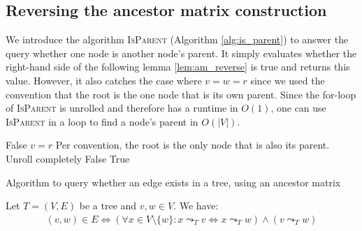 \subsection{Reversing the ancestor matrix construction}

We introduce the algorithm \textsc{IsParent} (Algorithm \ref{alg:is_parent}) to answer the query whether one node is another node's parent. It simply evaluates whether the right-hand side of the following lemma \ref{lem:am_reverse} is true and returns this value. However, it also catches the case where $v = w = r$ since we used the convention that the root is the one node that is its own parent. Since the for-loop of \textsc{IsParent} is unrolled and therefore has a runtime in $O(1)$, one can use \textsc{IsParent} in a loop to find a node's parent in $O(|V|)$.

\begin{algorithm}
    \begin{algorithmic}[1]
                \State \Return False
            \EndIf
                \State \Return $v = r$ \Comment Per convention, the root is the only node that is also its parent.
            \EndIf
             \Comment Unroll completely
                    \State \Return False
                \EndIf
            \EndFor
            \State \Return True
        \EndFunction
    \end{algorithmic}
    \caption{Algorithm to query whether an edge exists in a tree, using an ancestor matrix}
    \label{alg:is_parent}
\end{algorithm}

\begin{lemma}
    \label{lem:am_reverse}
    Let $T = (V, E)$ be a tree and $v, w \in V$. We have:
    \begin{align*}
        (v, w) \in E \Leftrightarrow (\forall x \in V \setminus \{w\}: x \leadsto_T v \Leftrightarrow x \leadsto_T w) \wedge (v \leadsto_T w)
    \end{align*}
\end{lemma}

